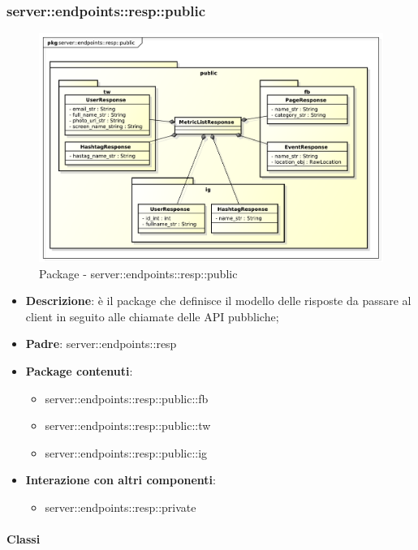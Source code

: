 \subsubsection{server::endpoints::resp::public} %
\label{ssub:bdsm_app_server_endpoints_resp_public}
\begin{figure}[!htbp]
	\centering
	\centerline{\includegraphics[scale=0.55]{./images/server/resp_public.pdf}}
	\caption{Package - server::endpoints::resp::public}
\end{figure}

\begin{itemize}
  \item \textbf{Descrizione}: è il package che definisce il modello delle risposte da passare al client in seguito alle chiamate delle API pubbliche;
  \item \textbf{Padre}: server::endpoints::resp
  \item \textbf{Package contenuti}:
  	\begin{itemize}
  		\item server::endpoints::resp::public::fb
  		\item server::endpoints::resp::public::tw
  		\item server::endpoints::resp::public::ig
	\end{itemize}
  \item \textbf{Interazione con altri componenti}:
  	\begin{itemize}
  		\item server::endpoints::resp::private
	\end{itemize}
\end{itemize}

	\paragraph{Classi} %

